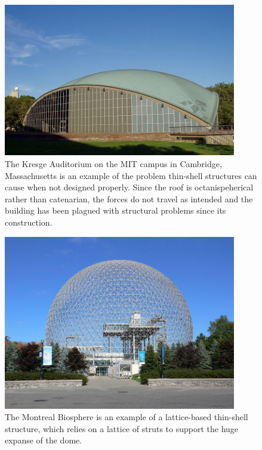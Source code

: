 \documentclass{thesis}
\begin{document}
\begin{figure}
\centering
\includegraphics[width=4in]{images/kresge_auditorium.jpg}
\caption[The Kresge Auditorium]{The Kresge Auditorium on the MIT campus in Cambridge, Massachusetts is an example of the problem thin-shell
structures can cause when not designed properly.  Since the roof is octanispeherical rather than catenarian, the forces do not travel as
intended and the building has been plagued with structural problems since its construction. \cite{img:kresge_aud}}
\label{fig:kresge_aud}
\end{figure}

\begin{figure}
\centering
\includegraphics[width=4in]{images/montreal_biosphere.jpg}
\caption[The Montreal Biosphere]{The Montreal Biosphere is an example of a lattice-based thin-shell structure, which relies on a lattice of
struts to support the huge expanse of the dome. \cite{img:montreal_bio}}
\label{fig:montreal_bio}
\end{figure}
\end{document}
